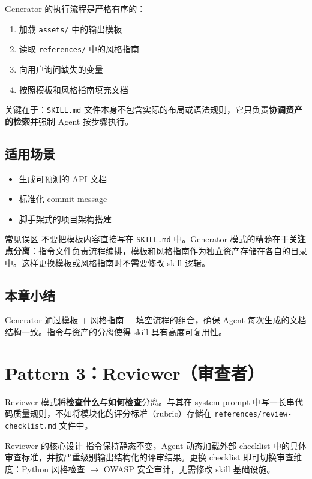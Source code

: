 \documentclass[a4paper]{article}
\begin{document}
Generator 的执行流程是严格有序的：

\begin{enumerate}
    \item 加载 \texttt{assets/} 中的输出模板
    \item 读取 \texttt{references/} 中的风格指南
    \item 向用户询问缺失的变量
    \item 按照模板和风格指南填充文档
\end{enumerate}

关键在于：\texttt{SKILL.md} 文件本身不包含实际的布局或语法规则，它只负责\textbf{协调资产的检索}并强制 Agent 按步骤执行。

\subsection{适用场景}

\begin{itemize}
    \item 生成可预测的 API 文档
    \item 标准化 commit message
    \item 脚手架式的项目架构搭建
\end{itemize}

\begin{warningbox}{常见误区}
不要把模板内容直接写在 \texttt{SKILL.md} 中。Generator 模式的精髓在于\textbf{关注点分离}：指令文件负责流程编排，模板和风格指南作为独立资产存储在各自的目录中。这样更换模板或风格指南时不需要修改 skill 逻辑。
\end{warningbox}

\subsection{本章小结}

Generator 通过模板 + 风格指南 + 填空流程的组合，确保 Agent 每次生成的文档结构一致。指令与资产的分离使得 skill 具有高度可复用性。

\section{Pattern 3：Reviewer（审查者）}

Reviewer 模式将\textbf{检查什么}与\textbf{如何检查}分离。与其在 system prompt 中写一长串代码质量规则，不如将模块化的评分标准（rubric）存储在 \texttt{references/review-checklist.md} 文件中。

\begin{importantbox}{Reviewer 的核心设计}
指令保持静态不变，Agent 动态加载外部 checklist 中的具体审查标准，并按严重级别输出结构化的评审结果。更换 checklist 即可切换审查维度：Python 风格检查 $\rightarrow$ OWASP 安全审计，无需修改 skill 基础设施。
\end{importantbox}
\end{document}
